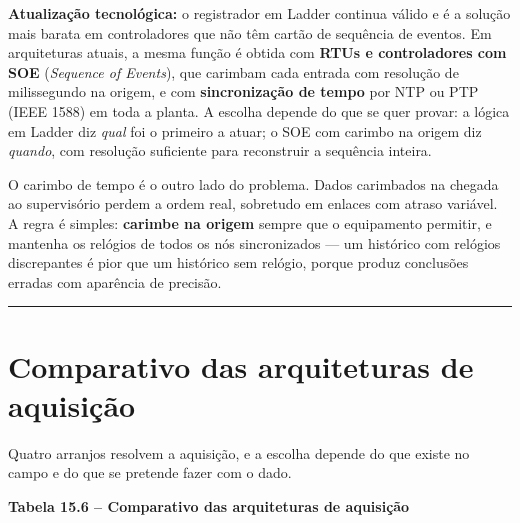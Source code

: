 \begin{caixanota}

\textbf{Atualização tecnológica:} o registrador em Ladder continua válido e é a solução mais barata
em controladores que não têm cartão de sequência de eventos. Em arquiteturas atuais, a mesma
função é obtida com \textbf{RTUs e controladores com SOE} (\emph{Sequence of Events}), que carimbam cada
entrada com resolução de milissegundo na origem, e com \textbf{sincronização de tempo} por NTP ou
PTP (IEEE 1588) em toda a planta. A escolha depende do que se quer provar: a lógica em Ladder diz
\emph{qual} foi o primeiro a atuar; o SOE com carimbo na origem diz \emph{quando}, com resolução suficiente
para reconstruir a sequência inteira.

\end{caixanota}

O carimbo de tempo é o outro lado do problema. Dados carimbados na chegada ao supervisório perdem a
ordem real, sobretudo em enlaces com atraso variável. A regra é simples: \textbf{carimbe na origem}
sempre que o equipamento permitir, e mantenha os relógios de todos os nós sincronizados --- um
histórico com relógios discrepantes é pior que um histórico sem relógio, porque produz conclusões
erradas com aparência de precisão.

\begin{center}\rule{0.5\linewidth}{0.5pt}\end{center}

\section{Comparativo das arquiteturas de aquisição}\label{comparativo-das-arquiteturas-de-aquisiuxe7uxe3o}

Quatro arranjos resolvem a aquisição, e a escolha depende do que existe no campo e do que se
pretende fazer com o dado.

\textbf{Tabela 15.6 -- Comparativo das arquiteturas de aquisição}

